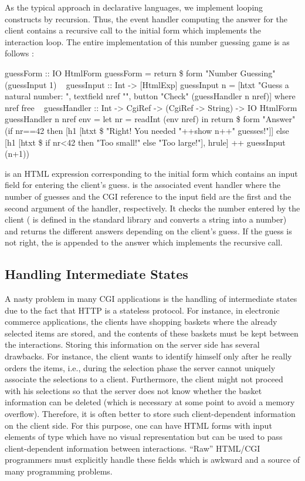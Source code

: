 As the typical approach in declarative languages,
we implement looping constructs by recursion.
Thus, the event handler computing the answer for the client
contains a recursive call to the initial form
which implements the interaction loop.
The entire implementation of this number guessing game
is as follows :
\begin{prog}
guessForm :: IO HtmlForm
guessForm = return \$ form "Number Guessing" (guessInput 1)
~
guessInput :: Int -> [HtmlExp]
guessInput n =
  [htxt "Guess a natural number: ", textfield nref "",
   button "Check" (guessHandler n nref)]   where nref free
~
guessHandler :: Int -> CgiRef -> (CgiRef -> String) -> IO HtmlForm
guessHandler n nref env =
  let nr = readInt (env nref) in
  return \$ form "Answer"
            (if nr==42
             then [h1 [htxt \$ "Right! You needed "++show n++" guesses!"]]
             else [h1 [htxt \$ if nr<42 then "Too small!"
                                       else "Too large!"],
                   hrule] ++ guessInput (n+1))
\end{prog}
 is an HTML expression corresponding to
the initial form which contains an
input field for entering the client's guess.
 is the associated event handler where the
number of guesses and the
CGI reference to the input field are the first and the second argument
of the handler, respectively.
It checks the number entered by the client
( is defined in the standard library
 and converts a string into a number)
and returns the different answers depending on the client's guess.
If the guess is not right, the  is appended
to the answer which implements the recursive call.


\subsection{Handling Intermediate States}
\label{sec-intermediate-state}

A nasty problem in many CGI applications is the handling
of intermediate states due to the fact that HTTP is a stateless
protocol. For instance, in electronic commerce applications,
the clients have shopping baskets where
the already selected items are stored, and the contents of
these baskets must be kept between the interactions.
Storing this information on the server side
has several drawbacks. For instance, the client
wants to identify himself only after he really orders
the items, i.e., during the selection phase the server
cannot uniquely associate the selections to a client.
Furthermore, the client might not proceed with his selections
so that the server does not know whether
the basket information can be deleted (which is necessary
at some point to avoid a memory overflow).
Therefore, it is often better to store such client-dependent
information on the client side. For this purpose,
one can have HTML forms with input elements of type 
which have no visual representation but can be used
to pass client-dependent information between interactions.
``Raw'' HTML/CGI programmers must explicitly handle
these fields which is awkward and a source of many
programming problems.

